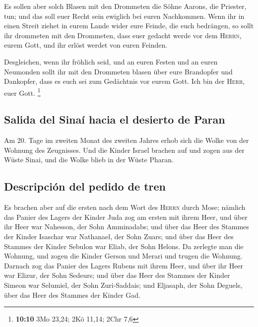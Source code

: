  Es sollen aber solch Blasen mit den Drommeten die Söhne
Aarons, die Priester, tun; und das soll euer Recht sein ewiglich bei
euren Nachkommen.  Wenn ihr in einen Streit ziehet in
eurem Lande wider eure Feinde, die euch bedrängen, so sollt ihr
drommeten mit den Drommeten, dass euer gedacht werde vor dem
\textsc{Herrn}, eurem Gott, und ihr erlöst werdet von euren Feinden.

 Desgleichen, wenn ihr fröhlich seid, und an euren Festen
und an euren Neumonden sollt ihr mit den Drommeten blasen über eure
Brandopfer und Dankopfer, dass es euch sei zum Gedächtnis vor eurem
Gott. Ich bin der \textsc{Herr}, euer Gott. \footnote{\textbf{10:10} 3Mo
  23,24; 2Kö 11,14; 2Chr 7,6}

\hypertarget{salida-del-sinauxed-hacia-el-desierto-de-paran}{%
\subsection{Salida del Sinaí hacia el desierto de
Paran}\label{salida-del-sinauxed-hacia-el-desierto-de-paran}}

 Am 20. Tage im zweiten Monat des zweiten Jahres erhob
sich die Wolke von der Wohnung des Zeugnisses.  Und die
Kinder Israel brachen auf und zogen aus der Wüste Sinai, und die Wolke
blieb in der Wüste Pharan.

\hypertarget{descripciuxf3n-del-pedido-de-tren}{%
\subsection{Descripción del pedido de
tren}\label{descripciuxf3n-del-pedido-de-tren}}

 Es brachen aber auf die ersten nach dem Wort des
\textsc{Herrn} durch Mose;  nämlich das Panier des Lagers
der Kinder Juda zog am ersten mit ihrem Heer, und über ihr Heer war
Nahesson, der Sohn Amminadabs;  und über das Heer des
Stammes der Kinder Isaschar war Nathanael, der Sohn Zuars;
 und über das Heer des Stammes der Kinder Sebulon war
Eliab, der Sohn Helons.  Da zerlegte man die Wohnung, und
zogen die Kinder Gerson und Merari und trugen die Wohnung.
 Darnach zog das Panier des Lagers Rubens mit ihrem Heer,
und über ihr Heer war Elizur, der Sohn Sedeurs;  und über
das Heer des Stammes der Kinder Simeon war Selumiel, der Sohn
Zuri-Saddais;  und Eljasaph, der Sohn Deguels, über das
Heer des Stammes der Kinder Gad.

